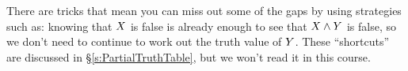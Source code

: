 %
%
%
%
%
%
%

There are tricks that mean you can miss out some of the gaps by using strategies such as: knowing that $X$ is false is already enough to see that $X\mathbin{\wedge}Y$ is false, so we don't need to continue to work out the truth value of $Y$. These ``shortcuts'' are discussed in \S\ref{s:PartialTruthTable}, but we won't read it in this course.




